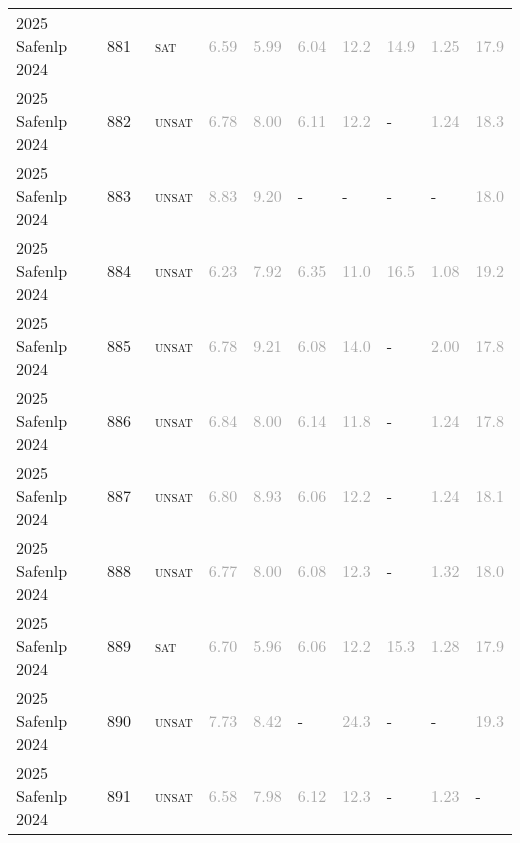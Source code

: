 \begin{center}
{\begin{longtable}{@{}llllllllll@{}}
2025 Safenlp 2024 & 881 & ~\textsc{sat} & \textcolor{darkgray}{6.59} & \textcolor{darkgray}{5.99} & \textcolor{darkgray}{6.04} & \textcolor{darkgray}{12.2} & \textcolor{darkgray}{14.9} & \textcolor{darkgray}{1.25} & \textcolor{darkgray}{17.9} \\
2025 Safenlp 2024 & 882 & ~\textsc{unsat} & \textcolor{darkgray}{6.78} & \textcolor{darkgray}{8.00} & \textcolor{darkgray}{6.11} & \textcolor{darkgray}{12.2} & - & \textcolor{darkgray}{1.24} & \textcolor{darkgray}{18.3} \\
2025 Safenlp 2024 & 883 & ~\textsc{unsat} & \textcolor{darkgray}{8.83} & \textcolor{darkgray}{9.20} & - & - & - & - & \textcolor{darkgray}{18.0} \\
2025 Safenlp 2024 & 884 & ~\textsc{unsat} & \textcolor{darkgray}{6.23} & \textcolor{darkgray}{7.92} & \textcolor{darkgray}{6.35} & \textcolor{darkgray}{11.0} & \textcolor{darkgray}{16.5} & \textcolor{darkgray}{1.08} & \textcolor{darkgray}{19.2} \\
2025 Safenlp 2024 & 885 & ~\textsc{unsat} & \textcolor{darkgray}{6.78} & \textcolor{darkgray}{9.21} & \textcolor{darkgray}{6.08} & \textcolor{darkgray}{14.0} & - & \textcolor{darkgray}{2.00} & \textcolor{darkgray}{17.8} \\
2025 Safenlp 2024 & 886 & ~\textsc{unsat} & \textcolor{darkgray}{6.84} & \textcolor{darkgray}{8.00} & \textcolor{darkgray}{6.14} & \textcolor{darkgray}{11.8} & - & \textcolor{darkgray}{1.24} & \textcolor{darkgray}{17.8} \\
2025 Safenlp 2024 & 887 & ~\textsc{unsat} & \textcolor{darkgray}{6.80} & \textcolor{darkgray}{8.93} & \textcolor{darkgray}{6.06} & \textcolor{darkgray}{12.2} & - & \textcolor{darkgray}{1.24} & \textcolor{darkgray}{18.1} \\
2025 Safenlp 2024 & 888 & ~\textsc{unsat} & \textcolor{darkgray}{6.77} & \textcolor{darkgray}{8.00} & \textcolor{darkgray}{6.08} & \textcolor{darkgray}{12.3} & - & \textcolor{darkgray}{1.32} & \textcolor{darkgray}{18.0} \\
2025 Safenlp 2024 & 889 & ~\textsc{sat} & \textcolor{darkgray}{6.70} & \textcolor{darkgray}{5.96} & \textcolor{darkgray}{6.06} & \textcolor{darkgray}{12.2} & \textcolor{darkgray}{15.3} & \textcolor{darkgray}{1.28} & \textcolor{darkgray}{17.9} \\
2025 Safenlp 2024 & 890 & ~\textsc{unsat} & \textcolor{darkgray}{7.73} & \textcolor{darkgray}{8.42} & - & \textcolor{darkgray}{24.3} & - & - & \textcolor{darkgray}{19.3} \\
2025 Safenlp 2024 & 891 & ~\textsc{unsat} & \textcolor{darkgray}{6.58} & \textcolor{darkgray}{7.98} & \textcolor{darkgray}{6.12} & \textcolor{darkgray}{12.3} & - & \textcolor{darkgray}{1.23} & - \\

\end{longtable}}
\end{center}
